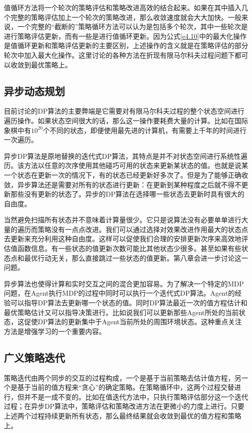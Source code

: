 \documentclass{ctexart}
\begin{document}
            值循环方法将一个轮次的策略评估和策略改进高效的结合起来。如果在其中插入几个完整的策略评估加上一个轮次的策略改进，那么收敛速度就会大大加快。一般来说，一个完整的“截断的”策略循环方法可以认为是包括多个轮次，其中一些轮次是进行策略评估更新，而有一些是进行值循环更新。因为公式\ref{e4.10}中的最大化操作是值循环更新和策略评估更新的主要区别，上述操作的含义就是在策略评估的部分轮次中加入最大化操作。这里讨论的各种方法在折现有限马尔科夫过程问题下都可以收敛到最优策略上。

        \subsection{异步动态规划}
            目前讨论的DP算法的主要弊端是它需要对有限马尔科夫过程的整个状态空间进行遍历操作。如果状态空间很大的话，那么这一操作要耗费大量的计算。比如在国际象棋中有$10^20$个不同的状态，即便使用最先进的计算机，有需要上千年的时间进行一次遍历。

            异步DP算法是原地替换的迭代式DP算法，其特点是并不对状态空间进行系统性遍历。该方法以任意的次序使用其他碰巧可用的状态来更新某状态的值。也就是说某一个状态在更新一次的情况下，有的状态已经更新好多次了。但是为了能够正确收敛，异步算法还是需要对所有的状态进行更新：在更新到某种程度之后就不得不更新那些没有更新的状态了。异步的DP算法在选择哪一些状态去更新时具有很大的自由度。

            当然避免扫描所有状态并不意味着计算量很少。它只是说算法没有必要单单进行大量的遍历而策略没有一点点改进。我们可以通过选择对效果改进作用最大的状态点去更新来充分利用这种自由度。这样可以促使我们合理的安排更新次序来高效地评估值函数信息。有一些状态的值更新次数可能比其他状态少很多。甚至如果有些状态点和最优行动无关，那么直接跳过一些状态的值更新。第八章会进一步讨论这一问题。

            异步算法也使得计算和实时交互之间的混合更加容易。为了解决一个特定的MDP问题，在Agent执行MDP的过程中同时可以执行一个迭代式DP算法。Agent的经验可以指导DP算法去更新哪一个状态的值。同时DP算法最近一次的值方程估计和最优策略估计又可以指导决策进行。比如说我们可以更新那些Agent所处的当前状态，这促使DP算法的更新集中于Agent当前所处的周围环境状态。这种重点关注方法是增强学习的一个重要内容。

        \subsection{广义策略迭代}
            策略迭代由两个同步的交互的过程构成，一个是基于当前策略去估计值方程，另一个是基于当前的值方程来“贪心”的确定策略。在策略循环中，这两个过程交替进行，但并不是一成不变的。比如在值迭代方法中，只执行策略评估部分这一个迭代过程；在异步DP算法中，策略评估和策略改进方法在更微小的力度上进行。只要上述两个过程持续更新所有状态，那么最终结果就会收敛到最优的值方程和策略上。
\end{document}

